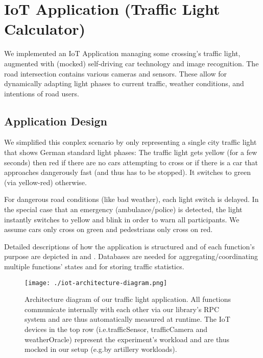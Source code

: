 \documentclass[../main.tex]{subfiles}
\begin{document}
\section{IoT Application (Traffic Light Calculator)}\label{sec:iot}

We implemented an IoT Application managing some crossing's traffic light, 
augmented with (mocked) self-driving car technology and image recognition. 
The road intersection contains various cameras and sensors. 
These allow for dynamically adapting light phases to current traffic, 
weather conditions, and intentions of road users. 

\subsection{Application Design}\label{ssec:iotApplicationStructure}

We simplified this conplex scenario by only representing a single city traffic light 
that shows German standard light phases: 
The traffic light gets yellow (for a few seconds) then red if there are no cars attempting to cross 
or if there is a car that approaches dangerously fast (and thus has to be stopped). 
It switches to green (via yellow-red) otherwise. 

For dangerous road conditions (like bad weather), each light switch is delayed. 
In the special case that an emergency (ambulance/police) is detected, 
the light instantly switches to yellow and blink 
in order to warn all participants. 
We assume cars only cross on green and pedestrians only cross on red.

Detailed descriptions of how the application is structured 
and of each function's purpose are depicted in 
 and .
Databases are needed for aggregating/coordinating multiple functions' states
and for storing traffic statistics. 

\begin{figure}
\begin{center}
  \texttt{[image: ./iot-architecture-diagram.png]}
\end{center}
\caption[IoT Architecture Diagram]{%
  Architecture diagram of our traffic light application.
  All functions communicate internally with each other via our library's RPC system
  and are thus automatically measured at runtime.
  The IoT devices in the top row (i.e.\@ trafficSensor, trafficCamera and weatherOracle) 
  represent the experiment's workload and are thus mocked in our setup (e.g.\@ by artillery workloads).%
}%
\label{fig:iotArchitectureDiagram}
\end{figure}
\end{document}
